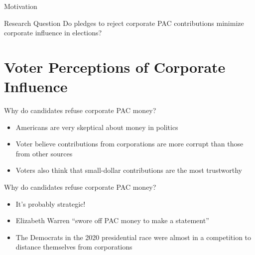 \documentclass[12pt, aspectratio=169]{beamer}
\begin{document}

\begin{frame}{Motivation}
	\begin{alertblock}{Research Question}
		Do pledges to reject corporate PAC contributions minimize corporate influence in elections?
	\end{alertblock}
\end{frame}


\section{Voter Perceptions of Corporate Influence} \label{sec: framework}

\begin{frame}{Why do candidates refuse corporate PAC money?}
	\begin{itemize}
		\item Americans are very skeptical about money in politics {\tiny \citep{lubenow2001}} \pause
		\item Voter believe contributions from corporations are more corrupt than those from other sources {\tiny {\citep{bowler2016}}} \pause
		\item Voters also think that small-dollar contributions are the most trustworthy
	\end{itemize}
\end{frame}

\begin{frame}{Why do candidates refuse corporate PAC money?}
	\begin{itemize}
		\item It's probably strategic! \pause
		\item Elizabeth Warren ``swore off PAC money to make a statement” {\tiny {\citep{nilsen2019}}} \pause
		\item The Democrats in the 2020 presidential race were almost in a competition to distance themselves from corporations 
	\end{itemize}
\end{frame}
\end{document}
